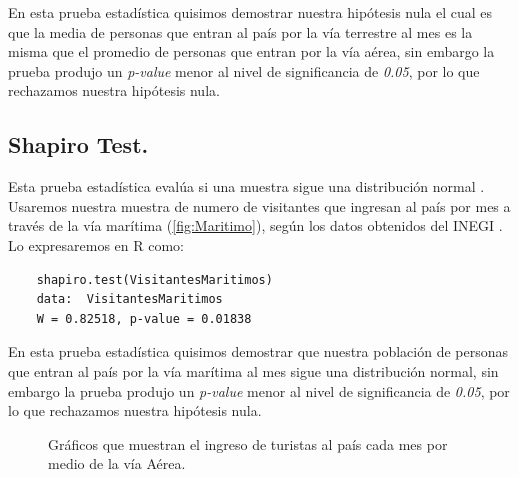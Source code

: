 \documentclass[]{article}
\begin{document}
 En esta prueba estadística quisimos demostrar  nuestra hipótesis nula el cual es que la media de personas que entran al país por la vía terrestre al mes es la misma que el promedio de personas que entran por la vía aérea, sin embargo la prueba produjo un \textit{p-value}  menor al nivel de significancia de \textit{0.05}, por lo que rechazamos nuestra hipótesis nula.
 
 
\subsection{Shapiro Test.}
 Esta prueba estadística evalúa si una muestra sigue una distribución normal \cite{Articulo_0}.
 Usaremos nuestra muestra de numero de visitantes que ingresan al país por mes a través de la vía marítima (\autoref{fig:Maritimo}), según los datos obtenidos del INEGI \cite{inegi}.
Lo expresaremos en R como:
  \begin{lstlisting}
	shapiro.test(VisitantesMaritimos)
	data:  VisitantesMaritimos
	W = 0.82518, p-value = 0.01838

   \end{lstlisting}
 En esta prueba estadística quisimos demostrar que  nuestra población de personas que entran al país por la vía marítima al mes sigue una distribución normal, sin embargo la prueba produjo un \textit{p-value}  menor al nivel de significancia de \textit{0.05}, por lo que rechazamos nuestra hipótesis nula.
 
\begin{figure}[b]
\centering
{}%
\hfill
{}%
\hfill

\caption{Gráficos que muestran el ingreso de turistas al país cada mes por medio de la vía Aérea.}
\label{fig:Avion}
\end{figure}
\end{document}

